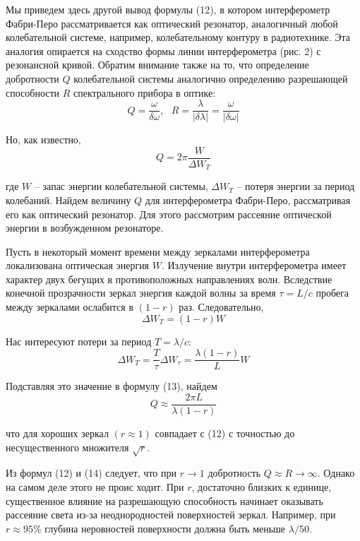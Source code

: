 \documentclass[14pt]{article}
\begin{document}
\noindent Мы приведем здесь другой вывод формулы (12), в котором интерферометр Фабри-Перо рассматривается
как оптический резонатор, аналогичный любой колебательной системе, например, колебательному контуру в
радиотехнике. Эта аналогия опирается на сходство формы линии интерферометра (рис. 2) с резонансной кривой. Обратим внимание также на
то, что определение добротности $Q$ колебательной системы аналогично определению разрешающей способности $R$ спектрального прибора в оптике:
$$
	Q = \frac{\omega}{\delta\omega},~~~R = \frac{\lambda}{|\delta\lambda|} = \frac{\omega}{|\delta\omega|}
$$

\noindent Но, как известно,
\begin{equation}
	Q = 2\pi\frac{W}{\Delta W_T}
\end{equation}

\noindent где $W$ -- запас энергии колебательной системы, $\Delta W_T$ -- потеря энергии за период колебаний. Найдем величину
$Q$ для интерферометра Фабри-Перо, рассматривая его как оптический резонатор. Для этого рассмотрим рассеяние оптической энергии в
возбужденном резонаторе.

Пусть в некоторый момент времени между зеркалами интерферометра локализована оптическая энергия $W$. Излучение внутри интерферометра
имеет характер двух бегущих в противоположных направлениях волн. Вследствие конечной прозрачности зеркал энергия каждой волны за время
$\tau = L/c$ пробега между зеркалами ослабится в $(1 - r)$ раз. Следовательно,
$$
	\Delta W_T = (1 - r)W
$$

\noindent Нас интересуют потери за период $T = \lambda/c$:
$$
	\Delta W_T = \frac{T}{\tau}\Delta W_\tau = \frac{\lambda(1 - r)}{L}W
$$

\noindent Подставляя это значение в формулу (13), найдем
\begin{equation}
	Q \approx \frac{2\pi L}{\lambda(1 - r)}
\end{equation}

\noindent что для хороших зеркал $(r \approx 1)$ совпадает с (12) с точностью до несущественного
множителя $\sqrt{r}$.

Из формул (12) и (14) следует, что при $r \rightarrow 1$ добротность $Q \approx R \rightarrow \infty$.
Однако на самом деле этого не проис ходит. При $r$, достаточно близких к единице, существенное влияние на разрешающую
способность начинает оказывать рассеяние света из-за неоднородностей поверхностей зеркал. Например, при $r \approx 95\%$ глубина
неровностей поверхности должна быть меньше $\lambda/50$.
\end{document}
